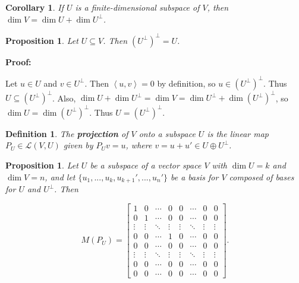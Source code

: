 \documentclass{article}
\theoremstyle{colontheorem}
\newtheorem{proposition}[theorem]{Proposition}
\newtheorem{definition}[theorem]{Definition}
\newtheorem{corollary}{Corollary}[theorem]
\newenvironment{Proposition}
{
	\begin{mdframed}[backgroundcolor=TheoremOrange!10]
	\begin{proposition}
}
{
	\end{proposition}
	\end{mdframed}
	
	\vspace{.15in}
}
\newenvironment{Def}
{
	\begin{mdframed}[backgroundcolor=DefGreen!10]
	\begin{definition}
}
{
	\end{definition}
	\end{mdframed}
	
	\vspace{.15in}
}
\newenvironment{Corollary}
{
	\begin{mdframed}[backgroundcolor=CorollaryBlue!10]
	\begin{corollary}
}
{
	\end{corollary}
	\end{mdframed}
	
	\vspace{.15in}
}
\newenvironment{Proof}
{
	\vspace{-.3in}
	
	\begin{mdframed}[backgroundcolor=ProofPurple!10]
	\textbf{Proof:}%
}
{
	\end{mdframed}
	
	\vspace{.15in}
}
\begin{document}
\begin{Corollary}
	
	If $U$ is a finite-dimensional subspace of $V$, then $\dim V = \dim U + \dim U^\perp$.
	
\end{Corollary}



\begin{Proposition}
	
	Let $U \subseteq V$. Then $(U^\perp)^\perp = U$.
	
\end{Proposition}



\begin{Proof}
	Let $u \in U$ and $v \in U^\perp$. Then $\left< u, v \right> = 0$ by definition, so $u \in (U^\perp)^\perp$. Thus $U \subseteq (U^\perp)^\perp$. Also, $\dim U + \dim U^\perp = \dim V = \dim U^\perp + \dim (U^\perp)^\perp$, so $\dim U = \dim (U^\perp)^\perp$. Thus $U = (U^\perp)^\perp$.
	
\end{Proof}



\begin{Def}
	
	The \textbf{projection} of $V$ onto a subspace $U$ is the linear map $P_U \in \mathcal{L}(V, U)$ given by $P_U v = u$, where $v = u + u' \in U \oplus U^\perp$.
	
\end{Def}



\begin{Proposition}
	
	Let $U$ be a subspace of a vector space $V$ with $\dim U = k$ and $\dim V = n$, and let $\{u_1, ..., u_k, u_{k+1}', ..., u_n'\}$ be a basis for $V$ composed of bases for $U$ and $U^\perp$. Then
	
	$$
		M(P_U) = \begin{bmatrix}
			1 & 0 & \cdots & 0 & 0 & \cdots & 0 & 0\\
			0 & 1 & \cdots & 0 & 0 & \cdots & 0 & 0\\
			\vdots & \vdots & \ddots & \vdots & \vdots & \ddots & \vdots & \vdots\\
			0 & 0 & \cdots & 1 & 0 & \cdots & 0 & 0\\
			0 & 0 & \cdots & 0 & 0 & \cdots & 0 & 0\\
			\vdots & \vdots & \ddots & \vdots & \vdots & \ddots & \vdots & \vdots\\
			0 & 0 & \cdots & 0 & 0 & \cdots & 0 & 0\\
			0 & 0 & \cdots & 0 & 0 & \cdots & 0 & 0
		\end{bmatrix}.
	$$
	
\end{Proposition}
\end{document}
